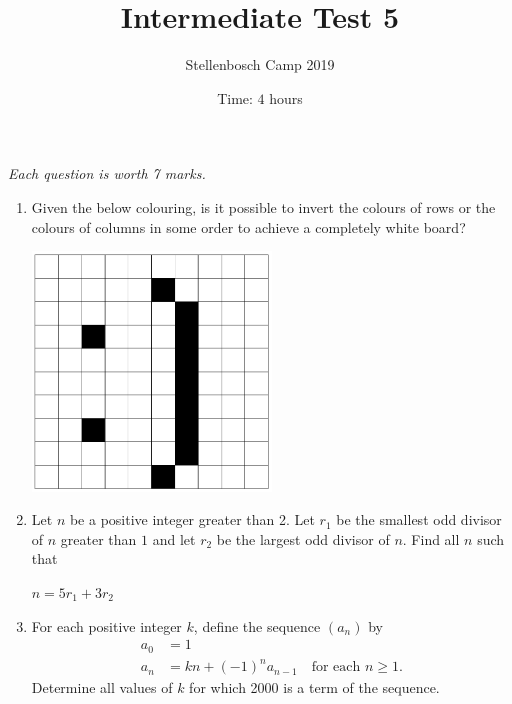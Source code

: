 \documentclass{article}
\title{Intermediate Test 5}
\author{Stellenbosch Camp 2019}
\date{Time: $4$ hours}
\begin{document}
\maketitle
\thispagestyle{empty}

\hfill\textit{Each question is worth 7 marks.}

\vfill
\vfill


\begin{enumerate}[1.]

\item %
Given the below colouring, is it possible to invert the colours of rows or the colours of columns in some order to achieve a completely white board?
\begin{center}
    \includegraphics[width=0.5\textwidth]{test_5_q_1.png}
\end{center}

\vfill

\item %
Let $n$ be a positive integer greater than 2. Let $r_1$ be the smallest odd divisor of $n$ greater than $1$ and let $r_2$ be the largest odd divisor of $n$. Find all $n$ such that
\begin{center}
 $n=5r_{1}+3r_{2}$
\end{center}

\vfill

\item %
For each positive integer $k$, define the sequence $(a_{n})$ by
\begin{align*}
	a_{0} &= 1 \\
	a_{n} &= kn + (-1)^{n}a_{n-1} \quad \text{for each } n \geqslant 1.
\end{align*}
Determine all values of $k$ for which 2000 is a term of the sequence.


\vfill


\end{enumerate}
\end{document}
